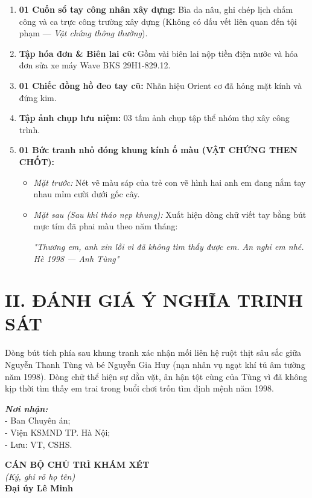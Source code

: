 \documentclass[12pt,a4paper]{article}
\begin{document}
\begin{enumerate}[label=\arabic*., leftmargin=1.5cm]
    \item \textbf{01 Cuốn sổ tay công nhân xây dựng:} Bìa da nâu, ghi chép lịch chấm công và ca trực công trường xây dựng (Không có dấu vết liên quan đến tội phạm — \textit{Vật chứng thông thường}).
    \item \textbf{Tập hóa đơn \& Biên lai cũ:} Gồm vài biên lai nộp tiền điện nước và hóa đơn sửa xe máy Wave BKS 29H1-829.12.
    \item \textbf{01 Chiếc đồng hồ đeo tay cũ:} Nhãn hiệu Orient cơ đã hỏng mặt kính và đứng kim.
    \item \textbf{Tập ảnh chụp lưu niệm:} 03 tấm ảnh chụp tập thể nhóm thợ xây công trình.
    \item \textbf{01 Bức tranh nhỏ đóng khung kính ố màu (VẬT CHỨNG THEN CHỐT):}
    \begin{itemize}[leftmargin=0.8cm]
        \item \textit{Mặt trước:} Nét vẽ màu sáp của trẻ con vẽ hình hai anh em đang nắm tay nhau mỉm cười dưới gốc cây.
        \item \textit{Mặt sau (Sau khi tháo nẹp khung):} Xuất hiện dòng chữ viết tay bằng bút mực tím đã phai màu theo năm tháng:
        \begin{center}
            \textit{"Thương em, anh xin lỗi vì đã không tìm thấy được em. An nghỉ em nhé. Hè 1998 — Anh Tùng"}
        \end{center}
    \end{itemize}
\end{enumerate}

\section*{II. ĐÁNH GIÁ Ý NGHĨA TRINH SÁT}
Dòng bút tích phía sau khung tranh xác nhận mối liên hệ ruột thịt sâu sắc giữa Nguyễn Thanh Tùng và bé Nguyễn Gia Huy (nạn nhân vụ ngạt khí tủ âm tường năm 1998). Dòng chữ thể hiện sự dằn vặt, ân hận tột cùng của Tùng vì đã không kịp thời tìm thấy em trai trong buổi chơi trốn tìm định mệnh năm 1998.

\vspace{0.8cm}

\noindent
\begin{minipage}[t]{0.45\textwidth}
    \small
    \textbf{\textit{Nơi nhận:}}\\
    - Ban Chuyên án;\\
    - Viện KSMND TP. Hà Nội;\\
    - Lưu: VT, CSHS.
\end{minipage}
\hfill
\begin{minipage}[t]{0.5\textwidth}
    \begin{center}
        \small
        \textbf{CÁN BỘ CHỦ TRÌ KHÁM XÉT}\\
        \textit{(Ký, ghi rõ họ tên)}\\[1.5cm]
        \textbf{Đại úy Lê Minh}
    \end{center}
\end{minipage}
\end{document}
